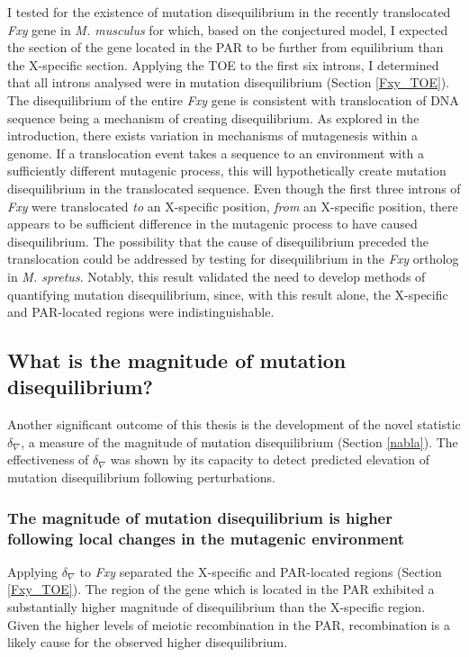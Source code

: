 I tested for the existence of mutation disequilibrium in the recently translocated \textit{Fxy} gene in \textit{M. musculus} for which, based on the conjectured model, I expected the section of the gene located in the PAR to be further from equilibrium than the X-specific section. Applying the TOE to the first six introns, I determined that all introns analysed were in mutation disequilibrium (Section \ref{Fxy_TOE}). The disequilibrium of the entire \textit{Fxy} gene is consistent with translocation of DNA sequence being a mechanism of creating disequilibrium. As explored in the introduction, there exists variation in mechanisms of mutagenesis within a genome. If a translocation event takes a sequence to an environment with a sufficiently different mutagenic process, this will hypothetically create mutation disequilibrium in the translocated sequence. Even though the first three introns of \textit{Fxy} were translocated \textit{to} an X-specific position, \textit{from} an X-specific position, there appears to be sufficient difference in the mutagenic process to have caused disequilibrium. The possibility that the cause of disequilibrium preceded the translocation could be addressed by testing for disequilibrium in the \textit{Fxy} ortholog in \textit{M. spretus}. Notably, this result validated the need to develop methods of quantifying mutation disequilibrium, since, with this result alone, the X-specific and PAR-located regions were indistinguishable.

\subsection{What is the magnitude of mutation disequilibrium?}

Another significant outcome of this thesis is the development of the novel statistic $\delta_\nabla$, a measure of the magnitude of mutation disequilibrium (Section \ref{nabla}). The effectiveness of $\delta_\nabla$ was shown by its capacity to detect predicted elevation of mutation disequilibrium following perturbations. 

\subsubsection{The magnitude of mutation disequilibrium is higher following local changes in the mutagenic environment}

Applying $\delta_\nabla$ to \textit{Fxy} separated the X-specific and PAR-located regions (Section \ref{Fxy_TOE}). The region of the gene which is located in the PAR exhibited a substantially higher magnitude of disequilibrium than the X-specific region. Given the higher levels of meiotic recombination in the PAR, recombination is a likely cause for the observed higher disequilibrium. 

